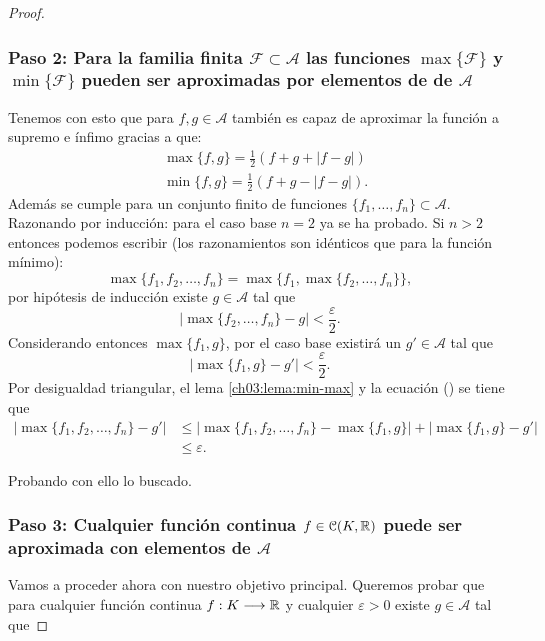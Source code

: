 \begin{proof}
    \subsubsection*{Paso 2: Para la familia finita $\mathcal{F} \subset \mathcal{A}$ las funciones $\max\{\mathcal{F}\}$ y $\min\{\mathcal{F}\}$ pueden ser aproximadas por elementos de
    de $\mathcal{A}$}
    \label{ch03:weiertrass-paso-2}
    Tenemos con esto que para $f,g \in \mathcal{A}$ también es capaz de aproximar la función
     a supremo e ínfimo  gracias a que:
    \begin{align} \label{eq:cerrado-min-max}
        & \max\{f,g\} = \frac{1}{2} (f+g+ |f-g|) \\
        & \min \{f,g\} = \frac{1}{2} (f+g -|f-g|). 
    \end{align}  
    Además se cumple para un conjunto 
    finito de funciones $\{f_1, \ldots, f_n \} \subset \mathcal{A}$. Razonando por inducción: para el caso base $n=2$ ya se ha probado. 
    Si $n >2$ entonces podemos escribir (los razonamientos son idénticos que para la función mínimo):
    \begin{equation}
        \max\{f_1, f_2, \ldots, f_n\}
        =
        \max\{f_1, \max\{f_2, \ldots, f_n\}\},
    \end{equation}
    por hipótesis de inducción existe
    $g \in \mathcal{A}$ tal que 
    \begin{equation}
        |\max\{f_2, \ldots, f_n\} - g|
        < 
        \frac{\varepsilon}{2}.
    \end{equation}
    Considerando entonces 
    $\max\{f_1,g\}$, por el caso base existirá 
    un $g' \in \mathcal{A}$ tal que
    \begin{equation}\label{cota:max-g}
        |\max\{f_1,g\} - g'| 
        < \frac{\varepsilon}{2}.
    \end{equation} 
    Por desigualdad triangular, el lema \ref{ch03:lema:min-max} y la ecuación () se tiene que 
    \begin{align}
        |\max\{f_1, f_2, \ldots, f_n\} 
        -
        g'
        | 
        &\leq
        |\max\{f_1, f_2, \ldots, f_n\} 
        -
        \max\{f_1,g\}
        |
        + 
        |
        \max\{f_1,g\}-
        g'
        | 
        \\
        &\leq
        \varepsilon.
    \end{align}

    Probando con ello lo buscado.
    
    \subsubsection*{Paso 3: Cualquier función continua $f \in \mathcal{C}(K, \mathbb{R})$ puede ser aproximada con elementos
    de $\mathcal{A}$}
    Vamos a proceder ahora con nuestro objetivo 
    principal. 
    Queremos probar que para cualquier función continua $f: K \longrightarrow \mathbb{R}$ y cualquier $\varepsilon > 0$ existe $g \in \mathcal{A}$ tal que 


\end{proof}
